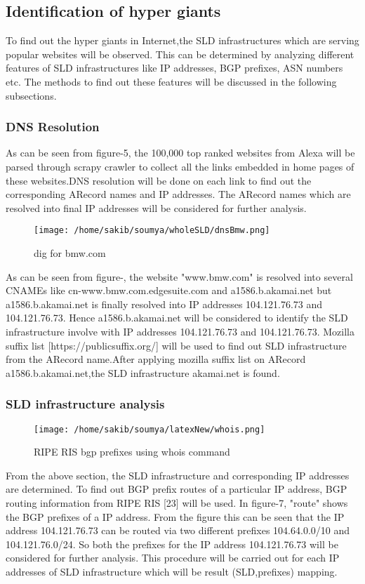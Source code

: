 \subsection{Identification of hyper giants}
To find out the hyper giants in Internet,the SLD infrastructures which are serving popular websites will be observed. This can be determined by analyzing different features of SLD infrastructures like IP addresses, BGP prefixes, ASN numbers etc. The methods to find out these features will be discussed in the following subsections.
\subsubsection{DNS Resolution}
As can be seen from figure-5, the 100,000  top ranked websites from Alexa will be parsed through scrapy crawler to collect all the links embedded in home pages of these websites.DNS resolution will be done on each link to find out the corresponding ARecord names and IP addresses. The ARecord names which are resolved into final IP addresses will be considered for further analysis.
\begin{figure}[h]
\texttt{[image: /home/sakib/soumya/wholeSLD/dnsBmw.png]}
\centering
\caption{dig for bmw.com}
\end{figure}
As can be seen from figure-, the website "www.bmw.com" is resolved into several CNAMEs like cn-www.bmw.com.edgesuite.com and a1586.b.akamai.net but a1586.b.akamai.net is  finally resolved into IP addresses 104.121.76.73 and 104.121.76.73. Hence a1586.b.akamai.net will be considered  to identify the SLD infrastructure involve with IP addresses 104.121.76.73 and 104.121.76.73. Mozilla suffix list [https://publicsuffix.org/] will be used to find out SLD infrastructure from the ARecord name.After applying mozilla suffix list on ARecord a1586.b.akamai.net,the SLD infrastructure akamai.net is found. 

\subsubsection{SLD infrastructure analysis}
\begin{figure}[h]
\texttt{[image: /home/sakib/soumya/latexNew/whois.png]}
\centering
\caption{RIPE RIS bgp prefixes using whois command}
\end{figure}
From the above section, the SLD infrastructure and corresponding IP addresses are determined. To find out BGP prefix routes of a particular IP address, BGP routing information from RIPE RIS [23] will be used. In figure-7, "route" shows the BGP prefixes of a IP address. From the figure this can be seen that the IP address 104.121.76.73 can be routed via two different prefixes 104.64.0.0/10 and 104.121.76.0/24. So both the prefixes for the IP address 104.121.76.73 will be considered for further analysis. This procedure will be carried out for each IP addresses of SLD infrastructure which will be result (SLD,prefixes) mapping.

